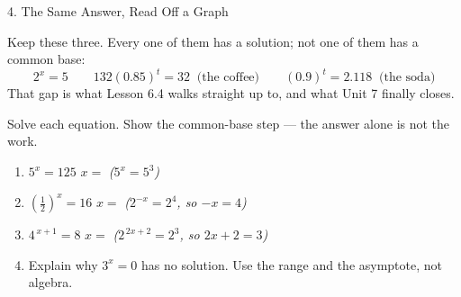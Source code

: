 \documentclass[10pt]{article}
\begin{document}
\begin{notesbox}{4. The Same Answer, Read Off a Graph}
\begin{tcolorbox}[colback=sky, colframe=navy, boxrule=0.8pt, arc=1.5mm,
    left=2.5mm, right=2.5mm, top=1.5mm, bottom=1.5mm]
\vspace{2pt}
Keep these three. Every one of them has a solution; not one of them has a common base:
\[
  2^{x}=5 \qquad 132(0.85)^{t}=32 \;\;\text{(the coffee)} \qquad (0.9)^{t}=2.118 \;\;\text{(the soda)}
\]
That gap is what Lesson 6.4 walks straight up to, and what Unit 7 finally closes.
\end{tcolorbox}
\end{notesbox}

\begin{practicebox}
Solve each equation. Show the common-base step --- the answer alone is not the work.
\begin{enumerate}[leftmargin=1.7em, itemsep=9pt]
  \item $5^{x}=125$ \hfill $x=$  \quad \emph{($5^{x}=5^{3}$)}

  \item $\left(\frac{1}{2}\right)^{x}=16$ \hfill $x=$  \quad \emph{($2^{-x}=2^{4}$, so $-x=4$)}

  \item $4^{\,x+1}=8$ \hfill $x=$  \quad \emph{($2^{\,2x+2}=2^{3}$, so $2x+2=3$)}

  \item Explain why $3^{x}=0$ has no solution. Use the range and the asymptote, not algebra.
\end{enumerate}
\end{practicebox}
\end{document}
